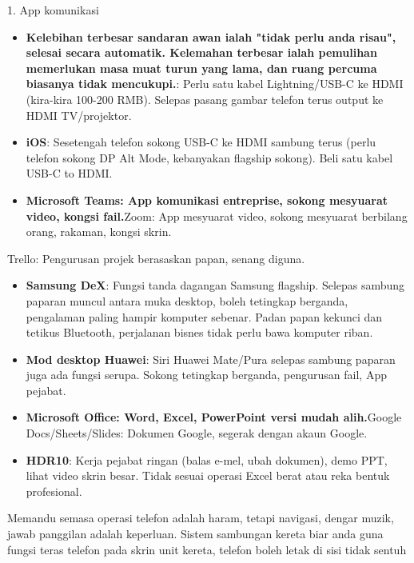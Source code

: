 
1. App komunikasi

\begin{itemize}
  \item \textbf{Kelebihan terbesar sandaran awan ialah "tidak perlu anda risau", selesai secara automatik. Kelemahan terbesar ialah pemulihan memerlukan masa muat turun yang lama, dan ruang percuma biasanya tidak mencukupi.}: Perlu satu kabel Lightning/USB-C ke HDMI (kira-kira 100-200 RMB). Selepas pasang gambar telefon terus output ke HDMI TV/projektor.
  \item \textbf{iOS}: Sesetengah telefon sokong USB-C ke HDMI sambung terus (perlu telefon sokong DP Alt Mode, kebanyakan flagship sokong). Beli satu kabel USB-C to HDMI.
  \item \textbf{Microsoft Teams: App komunikasi entreprise, sokong mesyuarat video, kongsi fail.}Zoom: App mesyuarat video, sokong mesyuarat berbilang orang, rakaman, kongsi skrin.
\end{itemize}


Trello: Pengurusan projek berasaskan papan, senang diguna.

\begin{itemize}
  \item \textbf{Samsung DeX}: Fungsi tanda dagangan Samsung flagship. Selepas sambung paparan muncul antara muka desktop, boleh tetingkap berganda, pengalaman paling hampir komputer sebenar. Padan papan kekunci dan tetikus Bluetooth, perjalanan bisnes tidak perlu bawa komputer riban.
  \item \textbf{Mod desktop Huawei}: Siri Huawei Mate/Pura selepas sambung paparan juga ada fungsi serupa. Sokong tetingkap berganda, pengurusan fail, App pejabat.
  \item \textbf{Microsoft Office: Word, Excel, PowerPoint versi mudah alih.}Google Docs/Sheets/Slides: Dokumen Google, segerak dengan akaun Google.
  \item \textbf{HDR10}: Kerja pejabat ringan (balas e-mel, ubah dokumen), demo PPT, lihat video skrin besar. Tidak sesuai operasi Excel berat atau reka bentuk profesional.
\end{itemize}


Memandu semasa operasi telefon adalah haram, tetapi navigasi, dengar muzik, jawab panggilan adalah keperluan. Sistem sambungan kereta biar anda guna fungsi teras telefon pada skrin unit kereta, telefon boleh letak di sisi tidak sentuh


